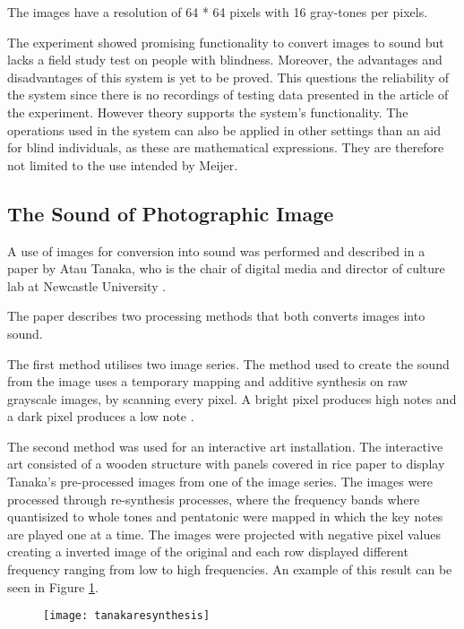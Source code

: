  
The images have a resolution of 64 * 64 pixels with 16 gray-tones per pixels.  

The experiment showed promising functionality to convert images to sound but lacks a field study test on people with blindness. Moreover, the advantages and disadvantages of this system is yet to be proved. This questions the reliability of the system since there is no recordings of testing data presented in the article of the experiment. However theory supports the system's functionality. The operations used in the system can also be applied in other settings than an aid for blind individuals, as these are mathematical expressions. They are therefore not limited to the use intended by Meijer.

\subsection{The Sound of Photographic Image}\label{sec:soundarticle}

A use of images for conversion into sound was performed and described in a paper by Atau Tanaka, who is the chair of digital media and director of culture lab at Newcastle University \cite{Tanaka2012}.

The paper describes two processing methods that both converts images into sound.

The first method utilises two image series. The method used to create the sound from the image uses a temporary mapping and additive synthesis on raw grayscale images, by scanning every pixel. A bright pixel produces high notes and a dark pixel produces a low note \cite{Tanaka2012}.

The second method was used for an interactive art installation. The interactive art consisted of a wooden structure with panels covered in rice paper to display Tanaka's pre-processed images from one of the image series. The images were processed through re-synthesis processes, where the frequency bands where quantisized to whole tones and pentatonic were mapped in which the key notes are played one at a time. The images were projected with negative pixel values creating a inverted image of the original and each row displayed different frequency ranging from low to high frequencies. An example of this result can be seen in Figure \ref{fig:tanakaresynthesis}.  

\begin{figure}[!h]
\centering
\texttt{[image: tanakaresynthesis]}
\caption{\label{fig:tanakaresynthesis}\cite{Tanaka2012}}
\end{figure}


